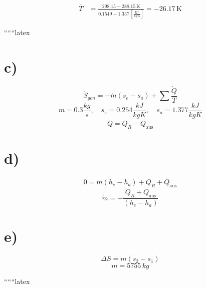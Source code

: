 \[
\begin{aligned}
    \overline{T} &= \frac{298.15 - 288.15 \, \text{K}}{0.1549 - 1.337 \, \left[\frac{\text{kJ}}{\text{kgK}}\right]} = -26.17 \, \text{K}
\end{aligned}
\]

``````latex

\section*{c)}
\begin{equation*}
\dot{S}_{gen} = -\dot{m}(s_e - s_a) + \sum \frac{\dot{Q}}{T}
\end{equation*}
\begin{equation*}
\dot{m} = 0.3 \frac{kg}{s}, \quad s_e = 0.254 \frac{kJ}{kgK}, \quad s_a = 1.377 \frac{kJ}{kgK}
\end{equation*}
\begin{equation*}
\dot{Q} = \dot{Q}_R - \dot{Q}_{\text{aus}}
\end{equation*}

\section*{d)}
\begin{equation*}
0 = \dot{m}(h_e - h_a) + \dot{Q}_R + \dot{Q}_{\text{aus}}
\end{equation*}
\begin{equation*}
\dot{m} = -\frac{\dot{Q}_R + \dot{Q}_{\text{aus}}}{(h_e - h_a)}
\end{equation*}

\section*{e)}
\begin{equation*}
\Delta S = m(s_2 - s_1)
\end{equation*}
\begin{equation*}
m = 5755 \, kg
\end{equation*}

``````latex


